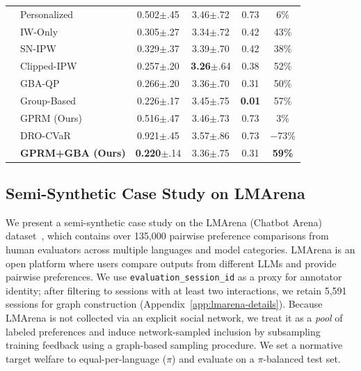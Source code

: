 \documentclass{article}
\theoremstyle{plain}
\theoremstyle{definition}
\theoremstyle{remark}
\begin{document}
\begin{table}[ht]
{\begin{tabular}{llcccc}
& Personalized & 0.502{\tiny$\pm$.45} & 3.46{\tiny$\pm$.72} & 0.73 & 6\% \\
& IW-Only & 0.305{\tiny$\pm$.27} & 3.34{\tiny$\pm$.72} & 0.42 & 43\% \\
& SN-IPW & 0.329{\tiny$\pm$.37} & 3.39{\tiny$\pm$.70} & 0.42 & 38\% \\
& Clipped-IPW & 0.257{\tiny$\pm$.20} & \cellcolor{bestgreen}\textbf{3.26}{\tiny$\pm$.64} & 0.38 & 52\% \\
& GBA-QP & 0.266{\tiny$\pm$.20} & 3.36{\tiny$\pm$.70} & 0.31 & 50\% \\
& Group-Based & 0.226{\tiny$\pm$.17} & 3.45{\tiny$\pm$.75} & \cellcolor{bestgreen}\textbf{0.01} & 57\% \\
& GPRM (Ours) & 0.516{\tiny$\pm$.47} & 3.46{\tiny$\pm$.73} & 0.73 & 3\% \\
& DRO-CVaR & 0.921{\tiny$\pm$.45} & 3.57{\tiny$\pm$.86} & 0.73 & $-$73\% \\
& \cellcolor{goodblue}\textbf{GPRM+GBA (Ours)} & \cellcolor{bestgreen}\textbf{0.220}{\tiny$\pm$.14} & \cellcolor{goodblue}3.36{\tiny$\pm$.75} & \cellcolor{goodblue}0.31 & \cellcolor{bestgreen}\textbf{59\%} \\
\bottomrule
\end{tabular}
}
\end{table}

\subsection{Semi-Synthetic Case Study on LMArena}
\label{subsec:exp-lmarena}

We present a semi-synthetic case study on the LMArena (Chatbot Arena)
dataset~\citep{chiang2024chatbotarena}, which contains over 135,000 pairwise
preference comparisons from human evaluators across multiple languages and
model categories. LMArena is an open platform where users compare outputs from
different LLMs and provide pairwise preferences. We use \texttt{evaluation\_session\_id}
as a proxy for annotator identity; after filtering to sessions with at least two interactions, we retain 5{,}591 sessions for graph construction (Appendix~\ref{app:lmarena-details}).
Because LMArena is not collected via an explicit social network, we treat it as a
\emph{pool} of labeled preferences and induce network-sampled inclusion by
subsampling training feedback using a graph-based sampling procedure. We set a
normative target welfare to equal-per-language ($\pi$) and evaluate on a
$\pi$-balanced test set.
\end{document}
